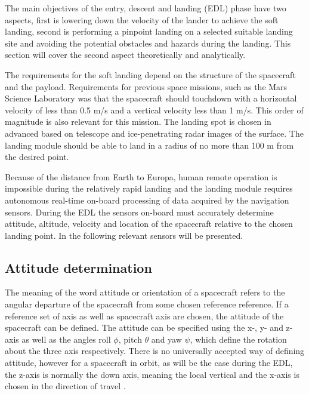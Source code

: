 
The main objectives of the entry, descent and landing (EDL) phase have two aspects, first is lowering down the velocity of the lander to achieve the soft landing, second is performing a pinpoint landing on a selected suitable landing site and avoiding the potential obstacles and hazards during the landing. This section will cover the second aspect theoretically and analytically. 

The requirements for the soft landing depend on the structure of the spacecraft and the payload. Requirements for previous space missions, such as the Mars Science Laboratory was that the spacecraft should touchdown with a horizontal velocity of less than 0.5 m/s and a vertical velocity less than 1 m/s. This order of magnitude is also relevant for this mission. The landing spot is chosen in advanced based on telescope and ice-penetrating radar images of the surface. The landing module should be able to land in a radius of no more than 100 m from the desired point. 

Because of the distance from Earth to Europa, human remote operation is impossible during the relatively rapid landing and the landing module requires autonomous real-time on-board processing of data acquired by the navigation sensors. During the EDL the sensors on-board must accurately determine attitude, altitude, velocity and location of the spacecraft relative to the chosen landing point. In the following relevant sensors will be presented. 

\subsection{Attitude determination}

The meaning of the word attitude or orientation of a spacecraft refers to the angular departure of the spacecraft from some chosen reference reference. If a reference set of axis as well as spacecraft axis are chosen, the attitude of the spacecraft can be defined. The attitude can be specified using the x-, y- and z- axis as well as the angles roll $\phi$, pitch $\theta$ and yaw $\psi$, which define the rotation about the three axis respectively. There is no universally accepted way of defining attitude, however for a spacecraft in orbit, as will be the case during the EDL, the z-axis is normally the down axis, meaning the local vertical and the x-axis is chosen in the direction of travel \cite{spacecraft}.

